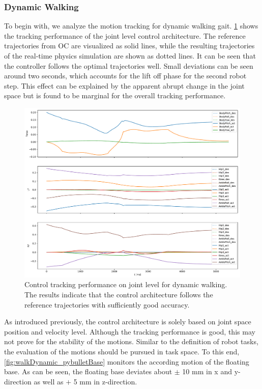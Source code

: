 \subsubsection{Dynamic Walking}
To begin with, we analyze the motion tracking for dynamic walking gait. \cref{fig:walkDynamic_pybulletTracking} shows the tracking performance of the joint level control architecture. The reference trajectories from \gls{OC} are visualized as solid lines, while the resulting trajectories of the real-time physics simulation are shown as dotted lines. It can be seen that the controller follows the optimal trajectories well. Small deviations can be seen around two seconds, which accounts for the lift off phase for the second robot step. This effect can be explained by the apparent abrupt change in the joint space but is found to be marginal for the overall tracking performance. 
\begin{figure}
\centering	
\includegraphics[width=.85\textwidth]{fig/walkDynamic/pybullet/pybulletTracking}
\caption[Control tracking performance on joint level for dynamic walking]{Control tracking performance on joint level for dynamic walking. The results indicate that the control architecture follows the reference trajectories with sufficiently good accuracy.}
\label{fig:walkDynamic_pybulletTracking}
\end{figure}
As introduced previously, the control architecture is solely based on joint space position and velocity level. Although the tracking performance is good, this may not prove for the stability of the motions. Similar to the definition of robot tasks, the evaluation of the motions should be pursued in task space. To this end, \cref{fig:walkDynamic_pybulletBase} monitors the according motion of the floating base. As can be seen, the floating base deviates about $\pm$ 10 mm in x and y-direction as well as $+$ 5 mm in z-direction. 
